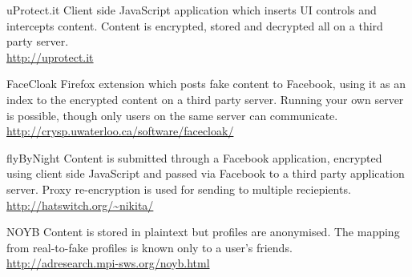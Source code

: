     \begin{desc}
    
        \item[uProtect.it] Client side JavaScript application which inserts UI controls and intercepts content. Content is encrypted, stored and decrypted all on a third party server. \hfill \\
        \url{http://uprotect.it}
        
        \item[FaceCloak] Firefox extension which posts fake content to Facebook, using it as an index to the encrypted content on a third party server. Running your own server is possible, though only users on the same server can communicate. \hfill \\
        \url{http://crysp.uwaterloo.ca/software/facecloak/}
        
        \item[flyByNight] Content is submitted through a Facebook application, encrypted using client side JavaScript and passed via Facebook to a third party application server. Proxy re-encryption is used for sending to multiple reciepients. \hfill \\
        \url{http://hatswitch.org/~nikita/}
        
        \item[NOYB] Content is stored in plaintext but profiles are anonymised. The mapping from real-to-fake profiles is known only to a user's friends. \hfill \\
        \url{http://adresearch.mpi-sws.org/noyb.html}
        
    \end{desc}





